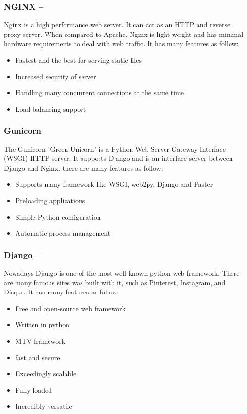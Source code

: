 \subsubsection*{NGINX  --  }
Nginx is a high performance web server. It can act as an HTTP and reverse proxy server. When compared to Apache, Nginx is light-weight and has minimal hardware requirements to deal with web traffic. It has many features as follow:
\begin{itemize}
	\item Fastest and the best for serving static files
	\item Increased security of server
	\item Handling many concurrent connections at the same time
	\item Load balancing support
\end{itemize}

\subsubsection*{Gunicorn}
The Gunicorn "Green Unicorn" is a Python Web Server Gateway Interface (WSGI) HTTP server. It supports Django and is an interface server between Django and Nginx.
there are many features as follow:
\begin{itemize}
	\item Supports many framework like WSGI, web2py, Django and Paster
	\item Preloading applications
	\item Simple Python configuration
	\item Automatic process management
\end{itemize}

\subsubsection*{Django  --  }
Nowadays Django is one of the most well-known python web framework. There are many famous sites was built with it, such as Pinterest, Instagram, and Disqus. 
It has many features as follow:
\begin{itemize}
	\item Free and open-source web framework
	\item Written in python
	\item MTV framework
	\item fast and secure
	\item Exceedingly scalable
	\item Fully loaded
	\item Incredibly versatile
\end{itemize}

